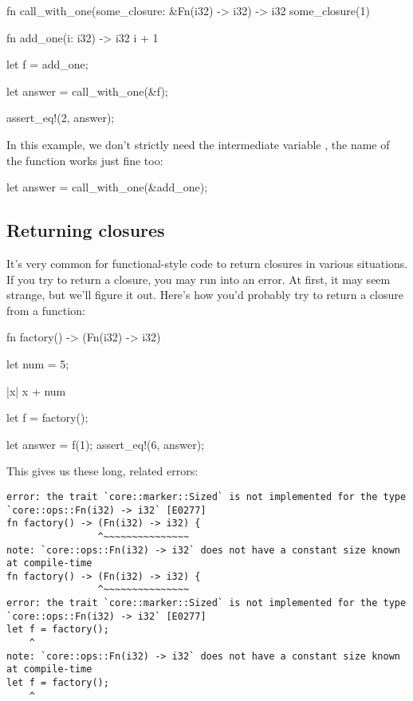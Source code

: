 \begin{rustc}
fn call_with_one(some_closure: &Fn(i32) -> i32) -> i32 {
    some_closure(1)
}

fn add_one(i: i32) -> i32 {
    i + 1
}

let f = add_one;

let answer = call_with_one(&f);

assert_eq!(2, answer);
\end{rustc}

In this example, we don't strictly need the intermediate variable , the name of the function works just fine too:

\begin{rustc}
let answer = call_with_one(&add_one);
\end{rustc}

\subsection*{Returning closures}

It's very common for functional-style code to return closures in various situations. If you try to return a closure, you may run 
into an error. At first, it may seem strange, but we'll figure it out. Here's how you'd probably try to return a closure from a 
function:

\begin{rustc}
fn factory() -> (Fn(i32) -> i32) {
    let num = 5;

    |x| x + num
}

let f = factory();

let answer = f(1);
assert_eq!(6, answer);
\end{rustc}

This gives us these long, related errors:

\begin{verbatim}
error: the trait `core::marker::Sized` is not implemented for the type
`core::ops::Fn(i32) -> i32` [E0277]
fn factory() -> (Fn(i32) -> i32) {
                ^~~~~~~~~~~~~~~~
note: `core::ops::Fn(i32) -> i32` does not have a constant size known at compile-time
fn factory() -> (Fn(i32) -> i32) {
                ^~~~~~~~~~~~~~~~
error: the trait `core::marker::Sized` is not implemented for the type `core::ops::Fn(i32) -> i32` [E0277]
let f = factory();
    ^
note: `core::ops::Fn(i32) -> i32` does not have a constant size known at compile-time
let f = factory();
    ^
\end{verbatim}

